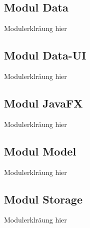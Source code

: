 \subsection{Modul Data}
\label{mod_data}

Modulerklräung hier




\subsection{Modul Data-UI}
\label{mod_data-ui}

Modulerklräung hier




\subsection{Modul JavaFX}
\label{mod_javafx}

Modulerklräung hier




\subsection{Modul Model}
\label{mod_model}

Modulerklräung hier




\subsection{Modul Storage}
\label{mod_storage}

Modulerklräung hier

